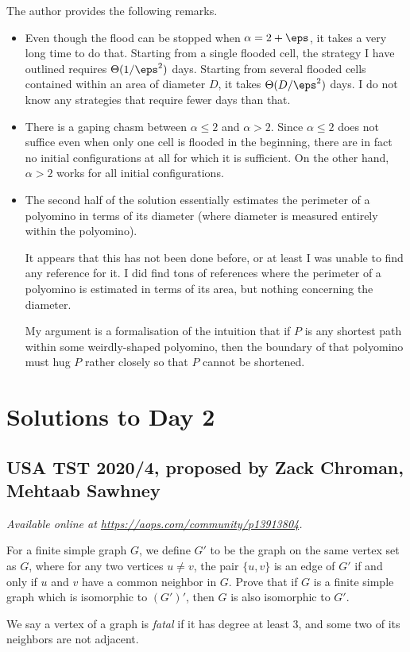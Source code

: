 \documentclass[11pt]{scrartcl}
\begin{document}
\begin{remark*}
  The author provides the following remarks.
  \begin{itemize}
  \item Even though the flood can be stopped when $\alpha = 2 + \eps$, it takes a very long time to do that. Starting from a single flooded cell, the strategy I have outlined requires $\Theta(1 / \eps^2)$ days. Starting from several flooded cells contained within an area of diameter $D$, it takes $\Theta( D / \eps^2)$ days. I do not know any strategies that require fewer days than that.
  \item There is a gaping chasm between $\alpha \le 2$ and $\alpha > 2$. Since $\alpha \le 2$ does not suffice even when only one cell is flooded in the beginning, there are in fact no initial configurations at all for which it is sufficient. On the other hand, $\alpha > 2$ works for all initial configurations.
  \item The second half of the solution essentially estimates the perimeter of a polyomino in terms of its diameter (where diameter is measured entirely within the polyomino).

  It appears that this has not been done before, or at least I was unable to find any reference for it. I did find tons of references where the perimeter of a polyomino is estimated in terms of its area, but nothing concerning the diameter.

  My argument is a formalisation of the intuition that if $P$ is any shortest path within some weirdly-shaped polyomino, then the boundary of that polyomino must hug $P$ rather closely so that $P$ cannot be shortened.
  \end{itemize}
\end{remark*}
\pagebreak

\section{Solutions to Day 2}
\subsection{USA TST 2020/4, proposed by Zack Chroman, Mehtaab Sawhney}
\textsl{Available online at \url{https://aops.com/community/p13913804}.}
\begin{mdframed}[style=mdpurplebox,frametitle={Problem statement}]
For a finite simple graph $G$, we define $G'$ to be the graph
on the same vertex set as $G$, where for any two vertices $u \neq v$,
the pair $\{u,v\}$ is an edge of $G'$ if and only if
$u$ and $v$ have a common neighbor in $G$.
Prove that if $G$ is a finite simple graph which is isomorphic to $(G')'$,
then $G$ is also isomorphic to $G'$.
\end{mdframed}
We say a vertex of a graph is \emph{fatal}
if it has degree at least $3$,
and some two of its neighbors are not adjacent.
\end{document}

